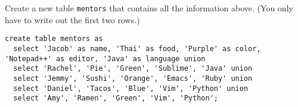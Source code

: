 \question Create a new table \lstinline$mentors$ that contains all the information above.
(You only have to write out the first two rows.)

\begin{solution}[1in]
\begin{lstlisting}
create table mentors as
  select 'Jacob' as name, 'Thai' as food, 'Purple' as color, 'Notepad++' as editor, 'Java' as language union
  select 'Rachel', 'Pie', 'Green', 'Sublime', 'Java' union
  select 'Jemmy', 'Sushi', 'Orange', 'Emacs', 'Ruby' union
  select 'Daniel', 'Tacos', 'Blue', 'Vim', 'Python' union
  select 'Amy', 'Ramen', 'Green', 'Vim', 'Python';
\end{lstlisting}
\end{solution}
